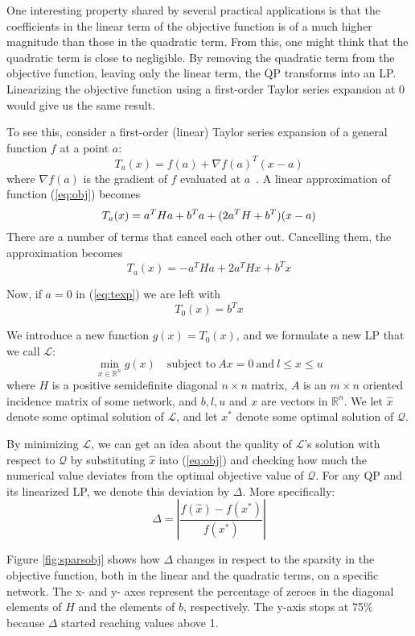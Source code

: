 One interesting property shared by several practical applications is that the
coefficients in the linear term of the objective function is of a much higher
magnitude than those in the quadratic term.
From this, one might think that the quadratic term is close to negligible.
By removing the quadratic term from the objective function, leaving only the
linear term, the QP transforms into an LP.
Linearizing the objective function using a first-order Taylor series expansion
at 0 would give us the same result.

To see this, consider a first-order (linear) Taylor series expansion of a
general function $f$ at a point $a$:
\[
T_a(x) = f(a) + \nabla f(a)^T(x-a)
\]
where $\nabla f(a)$ is the gradient of $f$ evaluated at $a$~\cite{apostol}.
A linear approximation of function (\ref{eq:obj}) becomes
\[
T_a(x) = a^THa + b^Ta + (2a^TH + b^T)(x - a) \\
\]
There are a number of terms that cancel each other out. Cancelling them,
the approximation becomes
\begin{equation}
\label{eq:texp}
T_a(x) = - a^THa + 2a^THx + b^Tx
\end{equation}

Now, if $a = 0$ in (\ref{eq:texp}) we are left with
\[
T_0(x) = b^Tx
\]

We introduce a new function $g(x) = T_0(x)$, and we formulate a new LP
that we call $\mathcal{L}$:
\[
\min_{x \in \mathbb{R}^n} g(x)
\quad \textrm{subject to}
~
Ax = 0
~
\textrm{and}
~
l \le x \le u
\]
where $H$ is a positive semidefinite diagonal $n \times n$ matrix, $A$ is an
$m \times n$ oriented incidence matrix of some network, and $b, l, u$ and $x$ are vectors in
$\mathbb{R}^n$.
We let $\hat{x}$ denote some optimal solution of $\mathcal{L}$, and let $x^*$
denote some optimal solution of $\mathcal{Q}$.

By minimizing $\mathcal{L}$, we can get an idea about the quality of
$\mathcal{L}$'s solution with respect to $\mathcal{Q}$ by substituting
$\hat{x}$ into (\ref{eq:obj}) and checking how much the numerical value
deviates from the optimal objective value of $\mathcal{Q}$.
For any QP and its linearized LP, we denote this deviation by $\Delta$.
More specifically:
\[
\Delta = \left|\frac{f(\hat{x}) - f(x^*)}{f(x^*)}\right|
\]

Figure \ref{fig:sparsobj} shows how $\Delta$ changes in respect to the sparsity
in the objective function, both in the linear and the quadratic terms, on a
specific network. The x- and y- axes represent the percentage of zeroes in the
diagonal elements of $H$ and the elements of $b$, respectively. The y-axis
stops at 75\% because $\Delta$ started reaching values above 1.

